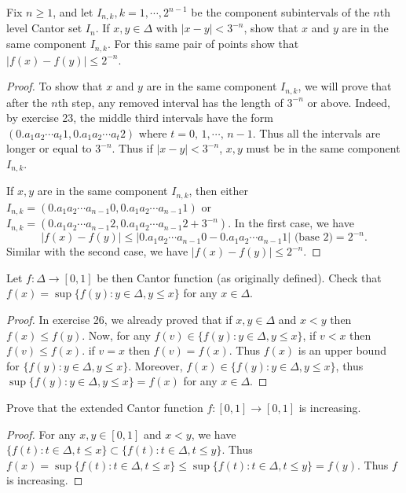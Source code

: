 \documentclass[12pt, a4paper]{article}
\theoremstyle{plain}
\begin{document}
\begin{exercise}{27}
Fix $n\geq 1$, and let $I_{n,k},k=1,\cdots ,2^{n-1}$ be the component subintervals of the $n$th level Cantor set $I_n$. If $x,y\in\Delta$ with $|x-y|<3^{-n}$, show that $x$ and $y$ are in the same component $I_{n,k}$. For this same pair of points show that $|f(x)-f(y)|\leq 2^{-n}$.
\end{exercise}
	\begin{proof}
	To show that $x$ and $y$ are in the same component $I_{n,k}$, we will prove that after the $n$th step, any removed interval has the length of $3^{-n}$ or above. Indeed, by exercise 23, the middle third intervals have the form $(0.a_1a_2\cdots a_{t}1,0.a_1a_2\cdots a_{t}2)$ where $t=0,\, 1,\cdots ,\,n-1$. Thus all the intervals are longer or equal to $3^{-n}$. Thus if $|x-y|<3^{-n}$, $x,y$ must be in the same component $I_{n,k}$. 
	
	If $x,y$ are in the same component $I_{n,k}$, then either $I_{n,k}=(0.a_1a_2\cdots a_{n-1}0,0.a_1a_2\cdots a_{n-1}1)$ or $I_{n,k}=(0.a_1a_2\cdots a_{n-1}2,0.a_1a_2\cdots a_{n-1}2+3^{-n})$. In the first case, we have
	\[
	|f(x)-f(y)|\leq |0.a_1a_2\cdots a_{n-1}0-0.a_1a_2\cdots a_{n-1}1| \text{ (base 2)}=2^{-n}.
	\]
	Similar with the second case, we have $|f(x)-f(y)|\leq 2^{-n}$.
	\end{proof}
	
\begin{exercise}{28}
Let $f:\Delta\rightarrow [0,1]$ be then Cantor function (as originally defined). Check that $f(x)=\sup \{f(y):y\in\Delta ,y\leq x\}$ for any $x\in\Delta$.
\end{exercise}
	\begin{proof}
	In exercise 26, we already 	proved that if $x,y\in\Delta$ and $x<y$ then $f(x)\leq f(y)$. Now, for any $f(v)\in \{f(y):y\in\Delta ,y\leq x\}$, if $v<x$ then $f(v)\leq f(x)$. if $v=x$ then $f(v)=f(x)$. Thus $f(x)$ is an upper bound for $\{f(y):y\in\Delta ,y\leq x\}$. Moreover, $f(x)\in\{f(y):y\in\Delta ,y\leq x\}$, thus $\sup\{f(y):y\in\Delta ,y\leq x\}=f(x)$ for any $x\in \Delta$.
	\end{proof}

\begin{exercise}{29}
Prove that the extended Cantor function $f:[0,1]\rightarrow [0,1]$ is increasing.
\end{exercise}
	\begin{proof}
	For any $x,y\in [0,1]$ and $x<y$, we have $\{f(t):t\in\Delta ,t\leq x\}\subset\{f(t):t\in\Delta ,t\leq y\}$. Thus $f(x)=\sup\{f(t):t\in\Delta ,t\leq x\}\leq \sup\{f(t):t\in\Delta ,t\leq y\}=f(y)$. Thus $f$ is increasing.
	\end{proof}
	
\end{document}
